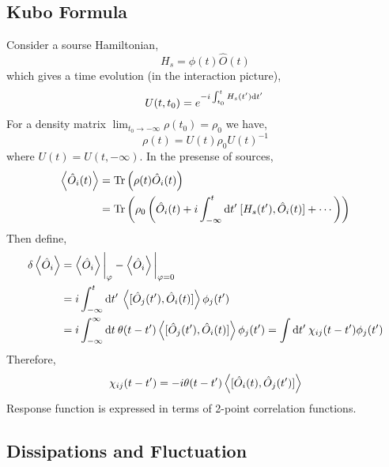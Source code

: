 \documentclass[12pt]{article}
\begin{document}
\subsection{Kubo Formula}

Consider a sourse Hamiltonian,
\[ H_s = \phi(t) \hat{O}(t) \]
which gives a time evolution (in the interaction picture),
\[ U(t, t_0) = e^{- i \int_{t_0}^t H_s(t') \mathrm{d}t' \: } \]
For a density matrix $\lim_{t_0 \to -\infty} \rho(t_0) = \rho_0$ we have,
\[ \rho(t) = U(t) \rho_0 U(t)^{-1} \]
where $U(t) = U(t, -\infty)$. 
In the presense of sources,
\begin{align*}
\left< \hat{O}_i(t) \right> & = \mathrm{Tr} \left( \rho(t) \hat{O}_i(t) \right)
\\
& = \mathrm{Tr} \left( \rho_0 \left( \hat{O}_i(t) + i \int_{-\infty}^t \mathrm{d}t' \: [ H_s(t'), \hat{O}_i(t) ] + \cdots \right) \right) 
\end{align*}
Then define,
\begin{align*}
\delta \left< \hat{O}_i \right> & = \left< \hat{O}_i \right> \bigg|_{\varphi} - \left< \hat{O}_i \right> \bigg|_{\varphi = 0}  
\\
& = i \int_{-\infty}^t \mathrm{d}t' \: \left< [\hat{O}_j(t'), \hat{O}_i(t)] \right> \phi_j(t')
\\
& = i \int_{-\infty}^{\infty} \mathrm{d}t \: \theta(t - t') \left< [\hat{O}_j(t'), \hat{O}_i(t)] \right> \phi_j(t') = \int \mathrm{d}t' \: \chi_{ij}(t - t') \phi_j(t')  
\end{align*}
Therefore,
\[ \chi_{ij}(t - t') = - i \theta(t - t') \left< [\hat{O}_i(t), \hat{O}_j(t')] \right> \]
Response function is expressed in terms of 2-point correlation functions. 

\subsection{Dissipations and Fluctuation}
\end{document}
